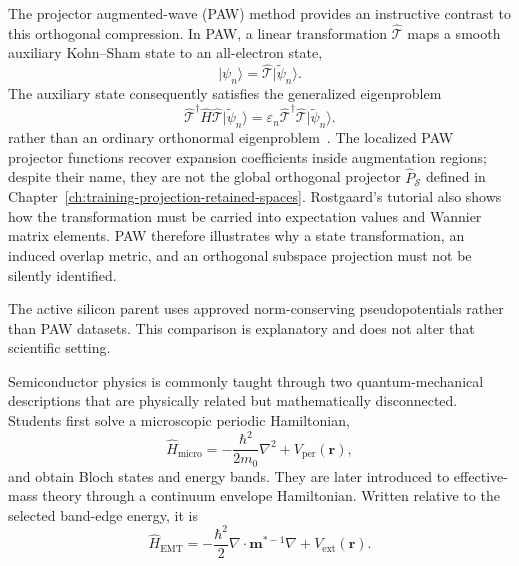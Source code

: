 The projector augmented-wave (PAW) method provides
 an instructive contrast to
this orthogonal compression. In PAW, a linear transformation
$\hat{\mathcal T}$ maps a smooth auxiliary Kohn--Sham state to an all-electron
state,
\begin{equation}
    \lvert\psi_n\rangle
    =
    \hat{\mathcal T}\lvert\widetilde\psi_n\rangle.
\end{equation}
The auxiliary state consequently satisfies the generalized eigenproblem
\begin{equation}
    \hat{\mathcal T}^{\dagger}\hat H\hat{\mathcal T}
    \lvert\widetilde\psi_n\rangle
    =
    \varepsilon_n
    \hat{\mathcal T}^{\dagger}\hat{\mathcal T}
    \lvert\widetilde\psi_n\rangle.
\end{equation}
rather than an ordinary orthonormal eigenproblem~\cite{rostgaard2009}. The
localized PAW projector functions recover expansion coefficients inside
augmentation regions; despite their name, they are not the global orthogonal
projector $\hat P_{\mathcal S}$ defined in
Chapter~\ref{ch:training-projection-retained-spaces}. Rostgaard's tutorial also shows
how the transformation must be carried into expectation values and Wannier
matrix elements. PAW therefore illustrates why a state transformation, an
induced overlap metric, and an orthogonal subspace projection must not be
silently identified.

The active silicon parent uses approved norm-conserving pseudopotentials rather
than PAW datasets. This comparison is explanatory and does not alter that
scientific setting.


Semiconductor physics is commonly taught through two quantum-mechanical
descriptions that are physically related but mathematically disconnected.
Students first solve a microscopic periodic Hamiltonian,
\begin{equation}
    \hat H_{\mathrm{micro}}
    =
    -\frac{\hbar^2}{2m_0}\nabla^2
    +
    V_{\mathrm{per}}(\mathbf r),
\end{equation}
and obtain Bloch states and energy bands. They are later introduced to
effective-mass theory through a continuum envelope Hamiltonian. Written
relative to the selected band-edge energy, it is
\begin{equation}
    \hat H_{\mathrm{EMT}}
    =
    -\frac{\hbar^2}{2}
    \nabla\mathbin{\cdot}\mathbf m^{*-1}\nabla
    +
    V_{\mathrm{ext}}(\mathbf r).
\end{equation}

